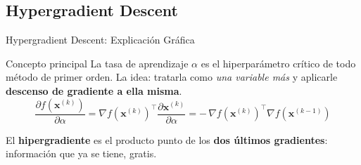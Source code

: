 \subsection{Hypergradient Descent}

\begin{frame}{Hypergradient Descent: Explicación Gráfica}
    \begin{block}{Concepto principal}
        \scriptsize
        La tasa de aprendizaje $\alpha$ es el hiperparámetro crítico de todo método de
        primer orden. La idea: tratarla como \emph{una variable más} y aplicarle
        \textbf{descenso de gradiente a ella misma}.
        \vspace{-0.3em}
        \[
            \frac{\partial f(\mathbf{x}^{(k)})}{\partial \alpha}
            = \nabla f(\mathbf{x}^{(k)})^{\top}
              \frac{\partial \mathbf{x}^{(k)}}{\partial \alpha}
            = -\,\nabla f(\mathbf{x}^{(k)})^{\top} \nabla f(\mathbf{x}^{(k-1)})
        \]
        \vspace{-0.5em}

        El \textbf{hipergradiente} es el producto punto de los \textbf{dos últimos
        gradientes}: información que ya se tiene, gratis.
    \end{block}


\end{frame}
